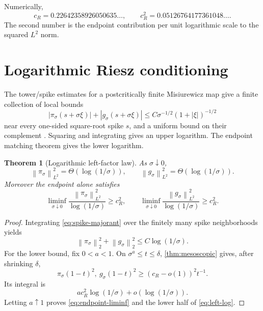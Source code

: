 \documentclass[11pt]{article}
\newtheorem{theorem}{Theorem}[section]
\theoremstyle{remark}
\newcommand{\norm}[1]{\left\lVert#1\right\rVert}
\begin{document}
Numerically,
\begin{equation}
 c_R=0.22642358926050635\ldots,
 \qquad
 c_R^2=0.05126764177361048\ldots.
 \label{eq:cR-numerical}
\end{equation}
The second number is the endpoint contribution per unit logarithmic scale to
the squared $L^2$ norm.

\section{Logarithmic Riesz conditioning}
\label{sec:conditioning}

The tower/spike estimates for a postcritically finite Misiurewicz map give a
finite collection of local bounds
\begin{equation}
 |\pi_\sigma(s+\sigma\xi)|
 +|g_\sigma(s+\sigma\xi)|
 \le C\sigma^{-1/2}(1+|\xi|)^{-1/2}
 \label{eq:spike-majorant}
\end{equation}
near every one-sided square-root spike $s$, and a uniform bound on their
complement \citep{Misiurewicz1981,KellerNowicki1992,Baladi2000,
WangBoundaryLayer2026}.  Squaring and integrating gives an upper logarithm.
The endpoint matching theorem gives the lower logarithm.

\begin{theorem}[Logarithmic left-factor law]
\label{thm:left-log}
As $\sigma\downarrow0$,
\begin{equation}
 \norm{\pi_\sigma}_{L^2}^2=\Theta(\log(1/\sigma)),
 \qquad
 \norm{g_\sigma}_{L^2}^2=\Theta(\log(1/\sigma)).
 \label{eq:left-log}
\end{equation}
Moreover the endpoint alone satisfies
\begin{equation}
 \liminf_{\sigma\downarrow0}
 \frac{\norm{\pi_\sigma}_{L^2}^2}{\log(1/\sigma)}
 \ge c_R^2,
 \qquad
 \liminf_{\sigma\downarrow0}
 \frac{\norm{g_\sigma}_{L^2}^2}{\log(1/\sigma)}
 \ge c_R^2.
 \label{eq:endpoint-liminf}
\end{equation}
\end{theorem}

\begin{proof}
Integrating \eqref{eq:spike-majorant} over the finitely many spike
neighborhoods yields
\begin{equation}
 \norm{\pi_\sigma}_2^2+\norm{g_\sigma}_2^2
 \le C\log(1/\sigma).
 \label{eq:log-upper}
\end{equation}
For the lower bound, fix $0<a<1$.  On
$\sigma^a\le t\le\delta$, \cref{thm:mesoscopic} gives, after shrinking
$\delta$,
\[
 \pi_\sigma(1-t)^2,\ g_\sigma(1-t)^2
 \ge(c_R-o(1))^2t^{-1}.
\]
Its integral is
\[
 a c_R^2\log(1/\sigma)+o(\log(1/\sigma)).
\]
Letting $a\uparrow1$ proves \eqref{eq:endpoint-liminf} and the lower half of
\eqref{eq:left-log}.
\end{proof}
\end{document}
